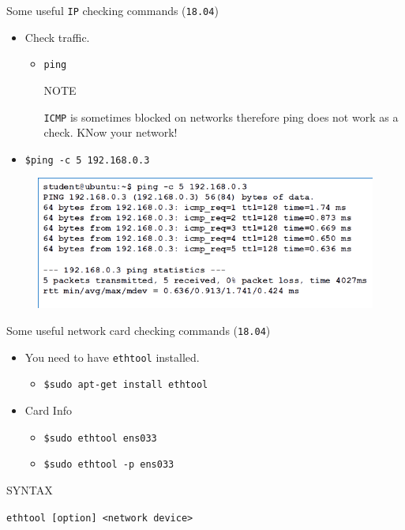 \documentclass{beamer}
\begin{document}
\begin{frame}{Some useful \texttt{IP} checking commands (\texttt{18.04})}
  \begin{itemize}
    \item Check traffic.
    \begin{itemize}
      \item \texttt{ping}  
      \begin{block}{NOTE}
        \begin{center}
          \texttt{ICMP} is sometimes blocked on networks therefore ping does not work as a check. KNow your network!
        \end{center}
      \end{block}          
    \end{itemize}
    \item \texttt{\$ping -c 5 192.168.0.3}
  \end{itemize}
  \begin{figure}
    \begin{center}
      \includegraphics[width=0.8\linewidth]{ping.png}
    \end{center}
  \end{figure}
\end{frame}

\begin{frame}{Some useful network card checking commands (\texttt{18.04})}
  \begin{itemize}
    \item You need to have \texttt{ethtool} installed.
    \begin{itemize}
      \item \texttt{\$sudo apt-get install ethtool}
    \end{itemize}
    \item Card Info
    \begin{itemize}
      \item \texttt{\$sudo ethtool ens033}
      \item \texttt{\$sudo ethtool -p ens033}
    \end{itemize}
  \end{itemize}
  \begin{block}{SYNTAX}
    \begin{center}
      \texttt{ethtool [option] <network device>}
    \end{center}
  \end{block}
\end{frame}
\end{document}
